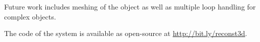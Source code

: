 \documentclass[letterpaper, 10 pt, conference]{ieeeconf}  %
\begin{document}
Future work includes meshing of the object as well as multiple loop handling for complex objects.

The code of the system is available as open-source at
\href{http://bit.ly/reconst3d}{http://bit.ly/reconst3d}.

\addtolength{\textheight}{-7cm}   %




\end{document}
